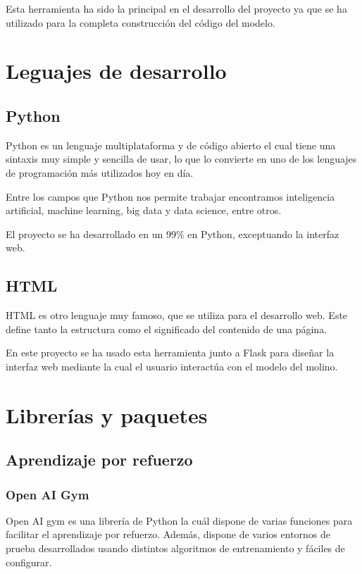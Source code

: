 Esta herramienta ha sido la principal en el desarrollo del proyecto ya que se ha utilizado para la completa construcción del código del modelo.


\section{Leguajes de desarrollo}

\subsection{Python}

Python\cite{Python} es un lenguaje multiplataforma y de código abierto el cual tiene una sintaxis muy simple y sencilla de usar, lo que lo convierte en uno de los lenguajes de programación más utilizados hoy en día.

Entre los campos que Python nos permite trabajar encontramos inteligencia artificial, machine learning, big data y data science, entre otros.

El proyecto se ha desarrollado en un 99\% en Python, exceptuando la interfaz web.

\subsection{HTML}

HTML\cite{HTML} es otro lenguaje muy famoso, que se utiliza para el desarrollo web. Este define tanto la estructura como el significado del contenido de una página.

En este proyecto se ha usado esta herramienta junto a Flask para diseñar la interfaz web mediante la cual el usuario interactúa con el modelo del molino.


\section{Librerías y paquetes}

\subsection{Aprendizaje por refuerzo}

\subsubsection{Open AI Gym}

Open AI gym es una librería de Python la cuál dispone de varias funciones para facilitar el aprendizaje por refuerzo. Además, dispone de varios entornos de prueba desarrollados usando distintos algoritmos de entrenamiento y fáciles de configurar.


